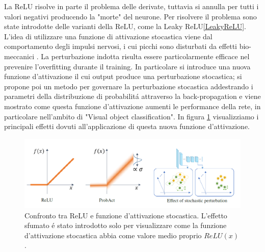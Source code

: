 \documentclass[a4paper,12pt]{report}
\begin{document}
 La ReLU risolve in parte il problema delle derivate, tuttavia si annulla per tutti i valori negativi producendo la "morte" del neurone. Per risolvere il problema sono state introdotte delle varianti della ReLU, come la Leaky ReLU\ref{LeakyReLU}. 
 L'idea di utilizzare una funzione di attivazione stocastica viene dal comportamento degli impulsi nervosi, i cui picchi sono disturbati da effetti bio-meccanici \cite{lewicki1998review}. La perturbazione indotta risulta essere particolarmente efficace nel prevenire l'overfitting durante il training. In particolare si introduce una nuova funzione d'attivazione il cui output produce una perturbazione stocastica; si propone poi un metodo per governare la perturbazione stocastica addestrando i parametri della distribuzione di probabilit\'a attraverso la back-propagation e viene mostrato come questa funzione d'attivazione aumenti le performance della rete, in particolare nell'ambito di "Visual object classification". 
 In figura \ref{ProbActEffectpng} visualizziamo i principali effetti dovuti all'applicazione di questa nuova funzione d'attivazione. 
 \begin{figure}[h!]
  \centering
  \includegraphics[scale=0.6]{ProbActEffect.png} 
  \caption{Confronto tra ReLU e funzione d'attivazione stocastica. L'effetto sfumato \'e stato introdotto solo per visualizzare come la funzione d'attivazione stocastica abbia come valore medio proprio $ReLU(x)$.}
  \label{ProbActEffectpng}
 \end{figure}
 
\end{document}
